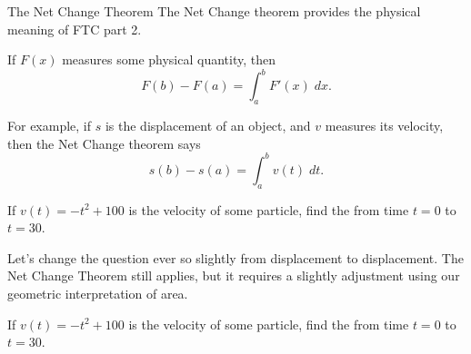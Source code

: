 \documentclass[../main.tex]{subfiles}
\begin{document}
\begin{lesson}{The Net Change Theorem}
  The Net Change theorem provides the physical meaning of FTC part 2.

  \begin{mdframed}[style=withref-compact]
    If \(F(x)\) measures some physical quantity, then 
    \[
      F(b) - F(a) = \int_{a}^{b} F'(x) \;dx.
    \]

  \end{mdframed}

  For example, if \(s\) is the displacement of an object, and \(v\) measures its velocity, then the Net Change theorem says 
  \[
    s(b) - s(a) = \int_{a}^{b} v(t) \;dt.
  \]

  \begin{example}
    If \(v(t) = -t^{2} + 100\) is the velocity of some particle, find the  from time \(t = 0\) to \(t = 30\).
  \end{example}
  \clearpage

  Let's change the question ever so slightly from  displacement to  displacement. The Net Change Theorem still applies, but it requires a slightly adjustment using our geometric interpretation of area.
  \begin{example}
    If \(v(t) = -t^{2} + 100\) is the velocity of some particle, find the  from time \(t = 0\) to \(t = 30\).
  \end{example}
\end{lesson}
\end{document}
